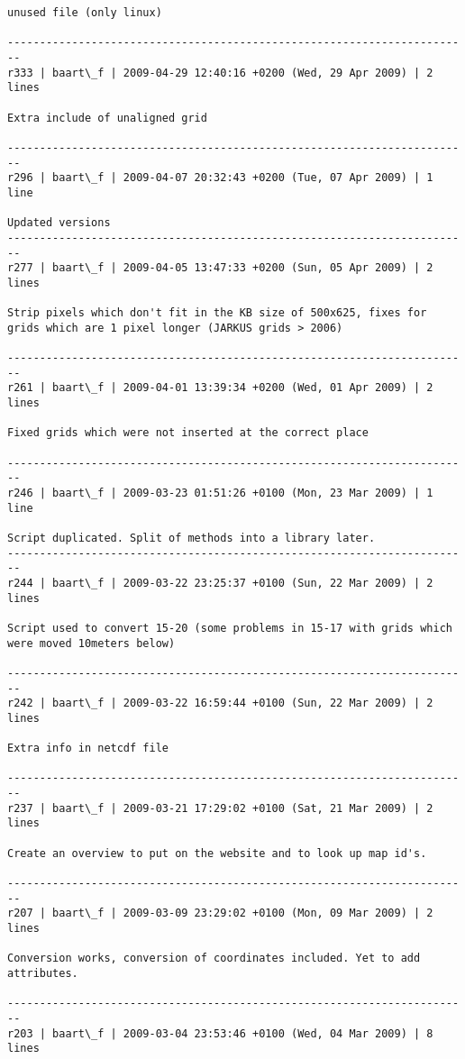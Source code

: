 \documentclass[9]{report}
\begin{document}
\begin{description}
\begin{verbatim}
unused file (only linux)

------------------------------------------------------------------------
r333 | baart\_f | 2009-04-29 12:40:16 +0200 (Wed, 29 Apr 2009) | 2 lines

Extra include of unaligned grid

------------------------------------------------------------------------
r296 | baart\_f | 2009-04-07 20:32:43 +0200 (Tue, 07 Apr 2009) | 1 line

Updated versions
------------------------------------------------------------------------
r277 | baart\_f | 2009-04-05 13:47:33 +0200 (Sun, 05 Apr 2009) | 2 lines

Strip pixels which don't fit in the KB size of 500x625, fixes for grids which are 1 pixel longer (JARKUS grids > 2006)

------------------------------------------------------------------------
r261 | baart\_f | 2009-04-01 13:39:34 +0200 (Wed, 01 Apr 2009) | 2 lines

Fixed grids which were not inserted at the correct place

------------------------------------------------------------------------
r246 | baart\_f | 2009-03-23 01:51:26 +0100 (Mon, 23 Mar 2009) | 1 line

Script duplicated. Split of methods into a library later. 
------------------------------------------------------------------------
r244 | baart\_f | 2009-03-22 23:25:37 +0100 (Sun, 22 Mar 2009) | 2 lines

Script used to convert 15-20 (some problems in 15-17 with grids which were moved 10meters below)

------------------------------------------------------------------------
r242 | baart\_f | 2009-03-22 16:59:44 +0100 (Sun, 22 Mar 2009) | 2 lines

Extra info in netcdf file

------------------------------------------------------------------------
r237 | baart\_f | 2009-03-21 17:29:02 +0100 (Sat, 21 Mar 2009) | 2 lines

Create an overview to put on the website and to look up map id's.

------------------------------------------------------------------------
r207 | baart\_f | 2009-03-09 23:29:02 +0100 (Mon, 09 Mar 2009) | 2 lines

Conversion works, conversion of coordinates included. Yet to add attributes.

------------------------------------------------------------------------
r203 | baart\_f | 2009-03-04 23:53:46 +0100 (Wed, 04 Mar 2009) | 8 lines


\end{verbatim}
\end{description}
\end{document}
